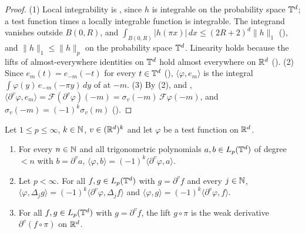 \begin{proof}
\leanok
(1) Local integrability is , since $h$ is integrable on the
probability space $\mathbb{T}^d$; a test function times a locally integrable function is integrable. The
integrand vanishes outside $B(0, R)$, and
$\int_{B(0,R)} |h(\pi x)| \, dx \leq (2R + 2)^d \|h\|_1$ (), and
$\|h\|_1 \leq \|h\|_p$ on the probability space $\mathbb{T}^d$. Linearity holds because the lifts of
almost-everywhere identities on $\mathbb{T}^d$ hold almost everywhere on $\mathbb{R}^d$
(). (2) Since $e_m(t) = e_{-m}(-t)$ for every $t \in \mathbb{T}^d$
(), $\langle \varphi, e_m \rangle$ is the integral
$\int \varphi(y) \, e_{-m}(-\pi y) \, dy$ of  at $-m$. (3) By (2),
 and ,
$\langle \partial^v \varphi, e_m \rangle = \mathcal{F}(\partial^v \varphi)(-m)
= \sigma_v(-m) \, \mathcal{F}\varphi(-m)$, and $\sigma_v(-m) = (-1)^k \sigma_v(m)$
().
\end{proof}

\begin{lemma}
\label{lem:torus-weak-derivative-to-lift}
\leanok
{}
Let $1 \leq p \leq \infty$, $k \in \mathbb{N}$, $v \in (\mathbb{R}^d)^k$ and let $\varphi$ be a test function on
$\mathbb{R}^d$.
\begin{enumerate}
  \item For every $n \in \mathbb{N}$ and all trigonometric polynomials $a, b \in L_p(\mathbb{T}^d)$ of degree
    $< n$ with $b = \partial^v a$,
    $\langle \varphi, b \rangle = (-1)^k \langle \partial^v \varphi, a \rangle$.
  \item Let $p < \infty$. For all $f, g \in L_p(\mathbb{T}^d)$ with $g = \partial^v f$ and every
    $j \in \mathbb{N}$, $\langle \varphi, \Delta_j g \rangle = (-1)^k \langle \partial^v \varphi,
    \Delta_j f \rangle$ and $\langle \varphi, g \rangle = (-1)^k \langle \partial^v \varphi, f
    \rangle$.
  \item For all $f, g \in L_p(\mathbb{T}^d)$ with $g = \partial^v f$, the lift $g \circ \pi$ is the weak
    derivative $\partial^v (f \circ \pi)$ on $\mathbb{R}^d$.
\end{enumerate}
\end{lemma}

